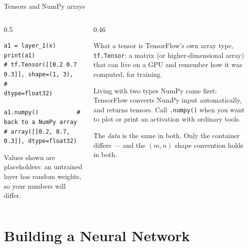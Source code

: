 \documentclass[aspectratio=169,10pt]{beamer}
\begin{document}
\begin{frame}[fragile]{Tensors and NumPy arrays}
  \begin{columns}[T,onlytextwidth]
    \begin{column}{0.5\textwidth}
\begin{lstlisting}
a1 = layer_1(x)
print(a1)
# tf.Tensor([[0.2 0.7 0.3]], shape=(1, 3),
#           dtype=float32)

a1.numpy()           # back to a NumPy array
# array([[0.2, 0.7, 0.3]], dtype=float32)
\end{lstlisting}
      \vspace{1mm}
      {\footnotesize\color{cugray} Values shown are placeholders: an untrained layer has
      random weights, so your numbers will differ.}
    \end{column}
    \begin{column}{0.46\textwidth}
      \footnotesize
      \begin{block}{What a tensor is}
        TensorFlow's own array type, \texttt{tf.Tensor}: a matrix (or higher-dimensional
        array) that can live on a GPU and remember how it was computed, for training.
      \end{block}
      \begin{block}{Living with two types}
        NumPy came first; TensorFlow converts NumPy input automatically, and returns
        tensors. Call \texttt{.numpy()} when you want to plot or print an activation with
        ordinary tools.
      \end{block}
      \begin{keyidea}
        The \emph{data} is the same in both. Only the container differs --- and the
        $(m,n)$ shape convention holds in both.
      \end{keyidea}
    \end{column}
  \end{columns}
\end{frame}

\section{Building a Neural Network}
\end{document}
